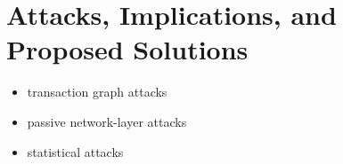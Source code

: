 \section{Attacks, Implications, and Proposed Solutions}
\begin{itemize}
	\item transaction graph attacks
	\item passive network-layer attacks
	\item statistical attacks
\end{itemize}